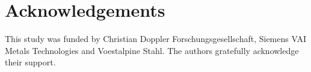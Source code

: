 \section{Acknowledgements}
This study was funded by Christian Doppler Forschungsgesellschaft, Siemens VAI Metals Technologies and Voestalpine Stahl. The authors gratefully acknowledge their support.